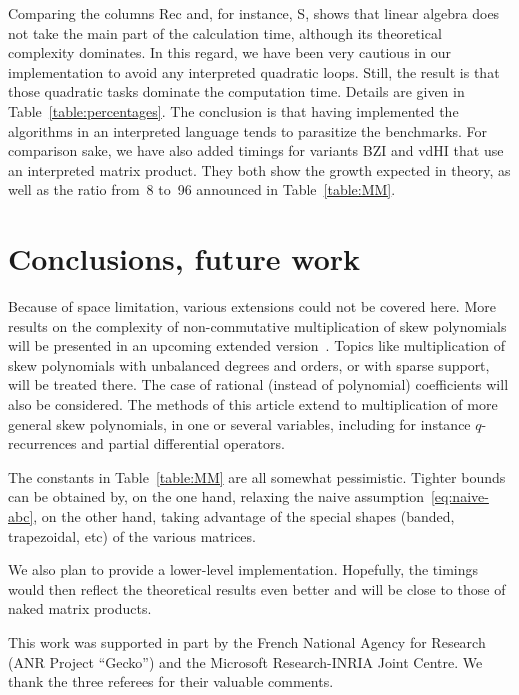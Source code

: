 \documentclass{sig-alt-full}
\begin{document}
Comparing the columns Rec and, for instance, S, shows that linear algebra does not take the main part of the calculation time, although its theoretical complexity dominates.
In this regard, we have been very cautious in our implementation to avoid any interpreted quadratic loops.
Still, the result is that those quadratic tasks dominate the computation time.
Details are given in Table~\ref{table:percentages}.
The conclusion is that having implemented the algorithms in an interpreted language tends to parasitize the benchmarks.
For comparison sake, we have also added timings for variants BZI and vdHI that use an interpreted matrix product.
They both show the growth expected in theory, as well as the ratio from~8 to~96 announced in Table~\ref{table:MM}.



\section{Conclusions, future work}

Because of space limitation, various extensions could not be covered here.
More results
on the complexity of non-commutative multiplication of skew polynomials
will be
presented in an upcoming extended version~\cite{LongVersion}.
Topics like multiplication of skew
polynomials with unbalanced degrees and orders, or with sparse support, will be treated there.
The case of
rational (instead of polynomial) coefficients will also be considered.
The methods of this
article extend to multiplication of more general skew polynomials, in one or several variables,
including for instance $q$-recurrences and partial differential operators.

The constants in Table~\ref{table:MM} are all somewhat pessimistic.
Tighter bounds can be obtained by, on the one hand, relaxing the naive assumption~\eqref{eq:naive-abc}, on the other hand, taking advantage of the special shapes (banded, trapezoidal, etc) of the various matrices.

We also plan to provide a lower-level implementation.
Hopefully, the timings would then reflect the theoretical results even better and will be close to those of naked matrix products.



\smallskip{} This work was supported in part by the French National Agency for Research (ANR Project ``Gecko'') and the Microsoft Research-INRIA Joint Centre.
We thank the three referees for their valuable comments.
\end{document}
